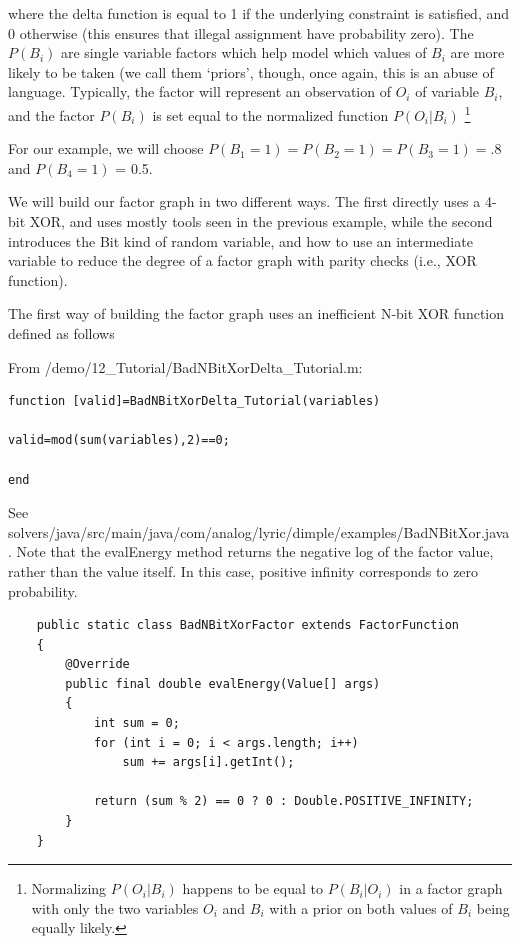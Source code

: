 where the delta function   is equal to 1 if the underlying constraint is 
satisfied, and 0 otherwise (this ensures that illegal assignment have 
probability zero). The $P(B_i)$ are single variable factors which help model 
which values of $ B_i $  are more likely to be taken (we call them `priors', 
though, once again, this is an abuse of language. Typically, the factor
 will represent an observation of  $ O_i $ of variable  $ B_i $, and the factor 
$ P(B_i) $  is 
set equal to the normalized function  $ P(O_i | B_i ) $ \footnote { Normalizing $ P(O_i|B_i) $ happens to be equal to $P(B_i|O_i)$ in a
factor graph with only the two variables $O_i$ and $B_i$ with a prior on both values of 
$B_i$ being equally likely. }



For our example, we will choose  $P(B_1 =1)=P(B_2=1)=P(B_3=1)=.8$ and  
$P(B_4=1)$ = 0.5.

We will build our factor graph in two different ways. The first directly uses a 4-bit XOR, and uses mostly tools seen in the previous example, while the second introduces the Bit kind of random variable, and how to use an intermediate variable to reduce the degree of a factor graph with parity checks (i.e., XOR function).

The first way of building the factor graph uses an inefficient N-bit XOR function defined as follows 

\ifmatlab

From /demo/12\_Tutorial/BadNBitXorDelta\_Tutorial.m:

\begin{lstlisting}
function [valid]=BadNBitXorDelta_Tutorial(variables)
 
valid=mod(sum(variables),2)==0;

end
\end{lstlisting}

\fi

\ifjava


See solvers/java/src/main/java/com/analog/lyric/dimple/examples/BadNBitXor.java.  Note that the evalEnergy method returns the negative log of the factor value, rather than the value itself.  In this case, positive infinity corresponds to zero probability.

\begin{lstlisting}
	public static class BadNBitXorFactor extends FactorFunction
	{
		@Override
		public final double evalEnergy(Value[] args)
		{
			int sum = 0;
			for (int i = 0; i < args.length; i++)
				sum += args[i].getInt();
			
			return (sum % 2) == 0 ? 0 : Double.POSITIVE_INFINITY;
		}
	}
\end{lstlisting}

